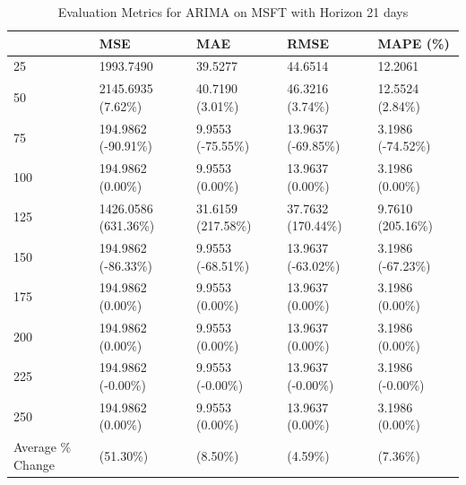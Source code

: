 \begin{table}
\caption{Evaluation Metrics for ARIMA on MSFT with Horizon 21 days}
\label{tab:arima_MSFT_h21_metrics}
\begin{tabular}{lllll}
\toprule
 & MSE & MAE & RMSE & MAPE (\%) \\
\midrule
25 & 1993.7490 & 39.5277 & 44.6514 & 12.2061 \\
50 & 2145.6935 (7.62\%) & 40.7190 (3.01\%) & 46.3216 (3.74\%) & 12.5524 (2.84\%) \\
75 & 194.9862 (-90.91\%) & 9.9553 (-75.55\%) & 13.9637 (-69.85\%) & 3.1986 (-74.52\%) \\
100 & 194.9862 (0.00\%) & 9.9553 (0.00\%) & 13.9637 (0.00\%) & 3.1986 (0.00\%) \\
125 & 1426.0586 (631.36\%) & 31.6159 (217.58\%) & 37.7632 (170.44\%) & 9.7610 (205.16\%) \\
150 & 194.9862 (-86.33\%) & 9.9553 (-68.51\%) & 13.9637 (-63.02\%) & 3.1986 (-67.23\%) \\
175 & 194.9862 (0.00\%) & 9.9553 (0.00\%) & 13.9637 (0.00\%) & 3.1986 (0.00\%) \\
200 & 194.9862 (0.00\%) & 9.9553 (0.00\%) & 13.9637 (0.00\%) & 3.1986 (0.00\%) \\
225 & 194.9862 (-0.00\%) & 9.9553 (-0.00\%) & 13.9637 (-0.00\%) & 3.1986 (-0.00\%) \\
250 & 194.9862 (0.00\%) & 9.9553 (0.00\%) & 13.9637 (0.00\%) & 3.1986 (0.00\%) \\
Average \% Change & (51.30\%) & (8.50\%) & (4.59\%) & (7.36\%) \\
\bottomrule
\end{tabular}
\end{table}
